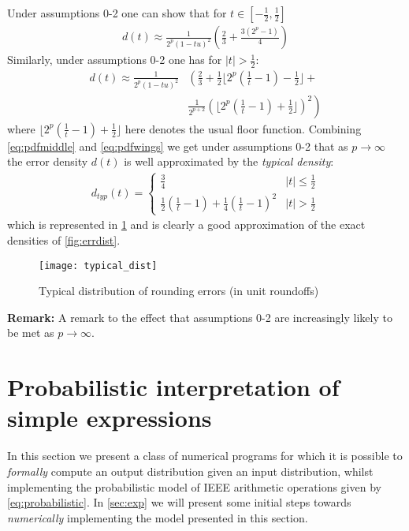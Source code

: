 \documentclass[10pt,conference]{IEEEtran}
\newcommand{\floor}[1]{\lfloor #1 \rfloor}
\newcommand{\absv}[1]{\vert #1\vert}
\begin{document}
Under assumptions 0-2 one can show that for $t\in\left[-\frac{1}{2},\frac{1}{2}\right]$
\begin{align}
d(t)\approx\frac{1}{2^p(1-tu)^2}\left(\frac{2}{3}+\frac{3(2^{p}-1)}{4}\right)\label{eq:pdfmiddle}
\end{align}
Similarly, under assumptions 0-2 one has for $\absv{t}>\frac{1}{2}$:
\begin{align}
d(t)\approx\frac{1}{2^p(1-tu)^2}& \left(\frac{2}{3}+\frac{1}{2}\floor{2^p(\frac{1}{t}-1)-\frac{1}{2}}+\right. \nonumber 
\\
&\left.\frac{1}{2^{p+2}}(\floor{2^p(\frac{1}{t}-1)+\frac{1}{2}})^2\right)\label{eq:pdfwings}
\end{align}
where $\floor{2^p(\frac{1}{t}-1)+\frac{1}{2}}$ here denotes the usual floor function.
Combining \cref{eq:pdfmiddle} and \cref{eq:pdfwings} we get under assumptions 0-2 that as $p\to\infty$ the error density $d(t)$ is well approximated by the \emph{typical density}:
\begin{align}
d_{typ}(t)=\begin{cases}
\frac{3}{4}&\absv{t}\leq\frac{1}{2}
\\
\frac{1}{2}\left(\frac{1}{t}-1\right)+\frac{1}{4}\left(\frac{1}{t}-1\right)^2 & \absv{t}>\frac{1}{2}
\end{cases}\label{eq:typicalpdf}
\end{align} 
which is represented in \cref{fig:typical} and is clearly a good approximation of the exact densities of \cref{fig:errdist}.
\begin{figure}[ht!]
\texttt{[image: typical\_dist]}
\caption{Typical distribution of rounding errors (in unit roundoffs)}
\label{fig:typical}
\end{figure}


\textbf{Remark:}
A remark to the effect that assumptions 0-2 are increasingly likely to be met as $p\to\infty$.


\section{Probabilistic interpretation of simple expressions}
In this section we present a class of numerical programs for which it is possible to \emph{formally} compute an output distribution given an input distribution, whilst implementing the probabilistic model of IEEE arithmetic operations given by \cref{eq:probabilistic}. In \cref{sec:exp} we will present some initial steps towards \emph{numerically} implementing the model presented in this section.
\end{document}
